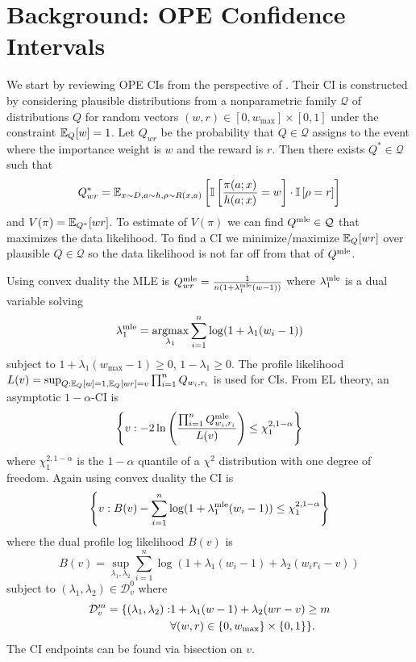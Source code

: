 \section{Background: OPE Confidence Intervals}
We start by reviewing OPE CIs from the perspective of
\cite{karampatziakis2019empirical}. Their CI is constructed by considering
plausible distributions from a nonparametric family $\mathcal{Q}$ of
distributions  $Q$ for random vectors $(w,r) \in [0,w_{\max}]\times [0,1]$
under the constraint $\mathbb{E}_Q[w]=1$. Let $Q_{wr}$ be the probability that $Q \in
\mathcal{Q}$ assigns to the event where the importance weight is $w$ and the
reward is $r$. Then there exists $Q^* \in \mathcal{Q}$ such that
\[
Q^*_{wr}=\mathbb{E}_{x\sim D,a\sim h,\rho\sim R(x,a)}
\left[
\mathbb{I}\left[\frac{\pi(a;x)}{h(a;x)}=w\right]\cdot
\mathbb{I}\left[\rho=r\right]
\right]
\]
and 
$
V(\pi)=\mathbb{E}_{Q^*}[wr]
$.
To estimate of $V(\pi)$ we can find $Q^{\textrm{mle}} \in \mathcal{Q}$ that maximizes
the data likelihood. To find a CI we minimize/maximize $\mathbb{E}_Q[wr]$ over
plausible $Q \in \mathcal{Q}$ so the data likelihood is not far off from that
of $Q^{\textrm{mle}}$.

Using convex duality the MLE is
$
Q^{\textrm{mle}}_{wr} = \frac{1}{n(1+\lambda_1^{\textrm{mle}}(w-1))}
$
where $\lambda_1^{\textrm{mle}}$ is a dual variable solving
\[
\lambda_1^{\textrm{mle}} = \operatorname*{argmax}_{\lambda_1} \sum_{i=1}^n \log(1+\lambda_1(w_i-1))
\]
subject to $1+\lambda_1(w_{\max}-1)\geq 0$, $1-\lambda_1\geq 0$.  The profile
likelihood
$
L(v)=\sup_{Q: \mathbb{E}_Q[w]=1, \mathbb{E}_Q[wr]=v} \prod_{i=1}^n Q_{w_i,r_i}
$
is used for CIs. From EL theory, an asymptotic $1-\alpha$-CI is
\[
\left\{v: -2\ln\left(\frac{\prod_{i=1}^n Q^{\textrm{mle}}_{w_i,r_i}}{L(v)}\right)
\leq \chi_1^{2,1-\alpha}\right\}
\]
where $\chi_1^{2,1-\alpha}$ is the $1-\alpha$ quantile of a $\chi^2$
distribution with one degree of freedom.  Again using convex duality the CI is
\[
\left\{v: 
B(v)-\sum_{i=1}^n\log(1+\lambda_1^{\textrm{mle}}(w_i-1))
\leq \chi_1^{2,1-\alpha}\right\}
\]
where the dual profile log likelihood $B(v)$ is
\begin{equation}
B(v) = \sup_{\lambda_1,\lambda_2} \sum_{i=1}^n \log(1+\lambda_1(w_i-1)+\lambda_2(w_i r_i -v))    \label{eq:dual-lik}
\end{equation}
subject to $(\lambda_1,\lambda_2) \in \mathcal{D}_v^0$ where 
\begin{align}
\mathcal{D}_v^{m} =
\{(\lambda_1,\lambda_2): & 1+\lambda_1(w-1)+\lambda_2(wr-v)\geq m \label{eq:batch-domain}\notag\\
                         & \forall (w,r) \in \{0,w_{\max}\}\times \{0,1\}
\}.
\end{align}
The CI endpoints can be found via bisection on $v$.

